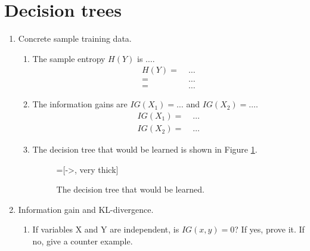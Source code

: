 \section{Decision trees}

\begin{enumerate}
\item Concrete sample training data.
  \begin{enumerate}
  \item The sample entropy $H(Y)$ is $\ldots$.
    \begin{align*}
      H(Y) =&\; \ldots \\
      =&\; \ldots \\
      =&\; \ldots
    \end{align*}

  \item The information gains are $IG(X_1) = \ldots$ and $IG(X_2) = \ldots$.  
    \begin{align*}
      IG(X_1) =&\; \ldots \\
      IG(X_2) =&\; \ldots
    \end{align*}

  \item The decision tree that would be learned is shown in Figure
    \ref{fig:decision_tree}.
    \begin{figure}[H]
      \centering
      =[->, very thick]
      \caption{The decision tree that would be learned.}
      \label{fig:decision_tree}
    \end{figure}
  \end{enumerate}

\item Information gain and KL-divergence.
\begin{enumerate}
	\item If variables X and Y are independent, is $IG(x,y) = 0$? If yes, prove it. If no, give a counter example.
	

\end{enumerate}
\end{enumerate}
